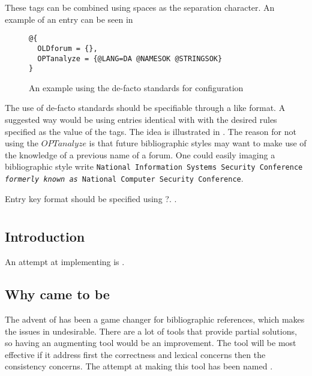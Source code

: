 These tags can be combined using spaces as the separation character.
An example of an entry can be seen in

\begin{figure}
  \centering
\begin{verbatim}
@{
  OLDforum = {},
  OPTanalyze = {@LANG=DA @NAMESOK @STRINGSOK}
}
\end{verbatim}
  \caption{An example using the de-facto standards for configuration}
  \label{fig:analyzing_added_de_facto_standards}
\end{figure}


The use of de-facto standards should be specifiable through a
{\bibtex} like format.  A suggested way would be using entries
identical with {\bibtex} with the desired rules specified as the value
of the tags.  The idea is illustrated in
.  The reason for not using the
$OPTanalyze$ is that future bibliographic styles may want to make use
of the knowledge of a previous name of a forum.  One could easily
imaging a bibliographic style write \texttt{National Information
  Systems Security Conference \textit{formerly known as} National
  Computer Security Conference}.

Entry key format should be specified using ?. .


\section{{\orangutan}}

\subsection{Introduction}

An attempt at implementing is {\orangutan}.


\subsection{Why {\orangutan} came to be}

The advent of {\bibtex} has been a game changer for bibliographic
references, which makes the issues in {\bibtex} undesirable.  There
are a lot of tools that provide partial solutions, so having an
augmenting tool would be an improvement.  The tool will be most
effective if it address first the correctness and lexical concerns
then the consistency concerns.  The attempt at making this tool has
been named \newdef{\orangutan}.


